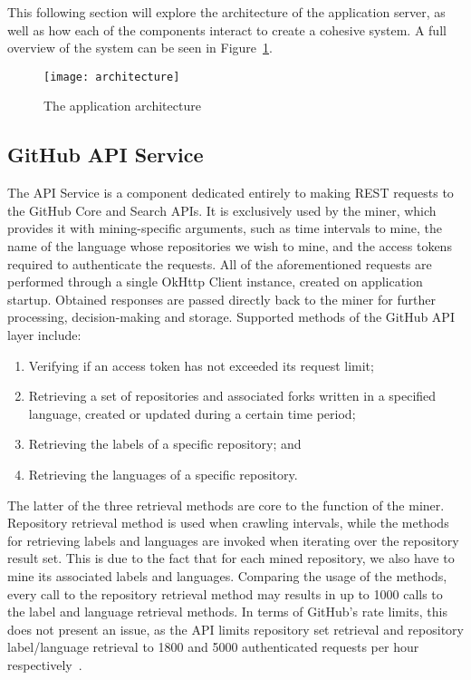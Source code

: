 This following section will explore the architecture of the application server, as well as how each of the components interact to create a cohesive system.
A full overview of the system can be seen in Figure~\ref{fig:2}.

\begin{figure}[h!]
    \centering
    \texttt{[image: architecture]}
    \caption{The application architecture}
    \label{fig:2}
\end{figure}

\subsection{GitHub API Service}

The API Service is a component dedicated entirely to making REST requests to the GitHub Core and Search APIs.
It is exclusively used by the miner, which provides it with mining-specific arguments, such as time intervals to mine, the name of the language whose repositories we wish to mine, and the access tokens required to authenticate the requests.
All of the aforementioned requests are performed through a single OkHttp Client instance, created on application startup.
Obtained responses are passed directly back to the miner for further processing, decision-making and storage.
Supported methods of the GitHub API layer include:
\begin{enumerate}
    \item Verifying if an access token has not exceeded its request limit;
    \item Retrieving a set of repositories and associated forks written in a specified language, created or updated during a certain time period;
    \item Retrieving the labels of a specific repository; and
    \item Retrieving the languages of a specific repository.
\end{enumerate}

The latter of the three retrieval methods are core to the function of the miner.
Repository retrieval method is used when crawling intervals, while the methods for retrieving labels and languages are invoked when iterating over the repository result set.
This is due to the fact that for each mined repository, we also have to mine its associated labels and languages.
Comparing the usage of the methods, every call to the repository retrieval method may results in up to 1000 calls to the label and language retrieval methods.
In terms of GitHub's rate limits, this does not present an issue, as the API limits repository set retrieval and repository label/language retrieval to 1800 and 5000 authenticated requests per hour respectively~\cite{APISEARCH,RATELIMIT}.

